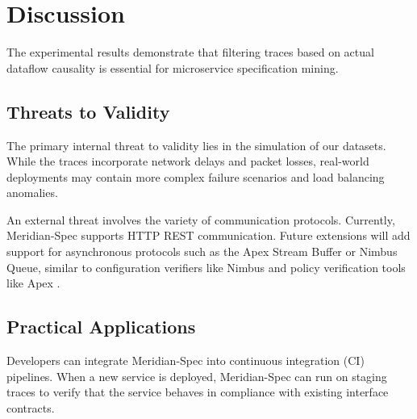 \section{Discussion}
The experimental results demonstrate that filtering traces based on actual dataflow causality is essential for microservice specification mining.

\subsection{Threats to Validity}
The primary internal threat to validity lies in the simulation of our datasets. While the traces incorporate network delays and packet losses, real-world deployments may contain more complex failure scenarios and load balancing anomalies.

An external threat involves the variety of communication protocols. Currently, Meridian-Spec supports HTTP REST communication. Future extensions will add support for asynchronous protocols such as the Apex Stream Buffer or Nimbus Queue, similar to configuration verifiers like Nimbus \cite{chen2023nimbus} and policy verification tools like Apex \cite{brown2020apex}.

\subsection{Practical Applications}
Developers can integrate Meridian-Spec into continuous integration (CI) pipelines. When a new service is deployed, Meridian-Spec can run on staging traces to verify that the service behaves in compliance with existing interface contracts.
